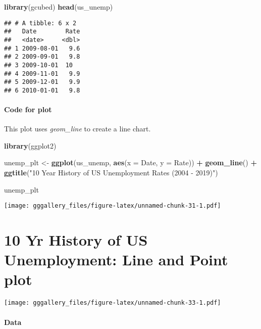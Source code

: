 \documentclass[]{book}
\newenvironment{Shaded}{\begin{snugshade}}{\end{snugshade}}
\newcommand{\DataTypeTok}[1]{\textcolor[rgb]{0.13,0.29,0.53}{#1}}
\newcommand{\KeywordTok}[1]{\textcolor[rgb]{0.13,0.29,0.53}{\textbf{#1}}}
\newcommand{\NormalTok}[1]{#1}
\newcommand{\OperatorTok}[1]{\textcolor[rgb]{0.81,0.36,0.00}{\textbf{#1}}}
\newcommand{\StringTok}[1]{\textcolor[rgb]{0.31,0.60,0.02}{#1}}
\begin{document}
\begin{Shaded}
\begin{Highlighting}[]
\KeywordTok{library}\NormalTok{(gcubed)}
\KeywordTok{head}\NormalTok{(us_unemp)}
\end{Highlighting}
\end{Shaded}

\begin{verbatim}
## # A tibble: 6 x 2
##   Date        Rate
##   <date>     <dbl>
## 1 2009-08-01   9.6
## 2 2009-09-01   9.8
## 3 2009-10-01  10  
## 4 2009-11-01   9.9
## 5 2009-12-01   9.9
## 6 2010-01-01   9.8
\end{verbatim}

\hypertarget{unempcode}{%
\subsubsection*{Code for plot}\label{unempcode}}

This plot uses \emph{geom\_line} to create a line chart.

\begin{Shaded}
\begin{Highlighting}[]
\KeywordTok{library}\NormalTok{(ggplot2)}

\NormalTok{unemp_plt <-}\StringTok{ }\KeywordTok{ggplot}\NormalTok{(us_unemp, }\KeywordTok{aes}\NormalTok{(}\DataTypeTok{x =}\NormalTok{ Date, }\DataTypeTok{y =}\NormalTok{ Rate)) }\OperatorTok{+}\StringTok{ }
\StringTok{  }\KeywordTok{geom_line}\NormalTok{() }\OperatorTok{+}\StringTok{ }
\StringTok{  }\KeywordTok{ggtitle}\NormalTok{(}\StringTok{"10 Year History of US Unemployment Rates (2004 - 2019)"}\NormalTok{)}

\NormalTok{unemp_plt}
\end{Highlighting}
\end{Shaded}

\texttt{[image: gggallery\_files/figure-latex/unnamed-chunk-31-1.pdf]}

\hypertarget{unempp}{%
\chapter*{10 Yr History of US Unemployment: Line and Point plot}\label{unempp}}

\texttt{[image: gggallery\_files/figure-latex/unnamed-chunk-33-1.pdf]}

\hypertarget{unemppdata}{%
\subsubsection*{Data}\label{unemppdata}}
\end{document}
